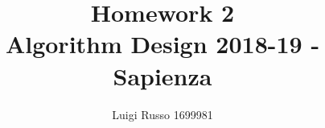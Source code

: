 \documentclass[11pt]{article}
\title{Homework 2\\
	\large Algorithm Design 2018-19 - Sapienza}
\author{Luigi Russo 1699981}
\begin{document}
	
\maketitle

\newpage
\tableofcontents
\newpage



\begin{thebibliography}{10}	
\end{thebibliography}
\end{document}
